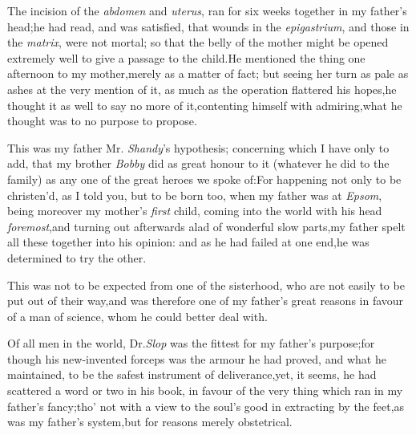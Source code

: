 \documentclass{article}
\begin{document}
The incision of the \textit{abdomen} and \textit{ute\-rus},
ran for six weeks together in my father’s
head;\tsk he had read, and was satisfied, that wounds in
the \textit{epigastrium}, and those in the \textit{matrix}, were not
mortal;\tsk\break
so that the belly of the mother might be\pb
opened extremely well to give a passage to the child.\tsk He mentioned the thing one
afternoon to my mother,\tsk merely as a matter of fact; but seeing her turn as pale
as ashes at the very mention of it, as much as the operation flattered his
hopes,\tsk he thought it as well to say no more of it,\tsk contenting himself with
admiring,\tsk what he thought was to no purpose to propose.

This was my father Mr. \textit{Shandy}’s hypothesis; concerning
which I have only to add, that my brother \textit{Bobby} did as
great honour to it (whatever he did to the family) as any one of
the great heroes we spoke of:\tsk For happening not only to be
christen’d, as I told you, but to be born too, when my father
was at \textit{Epsom},\tsk\break
being moreover my mother’s \textit{first} child,\break
\tsk coming into the world with his head
\textit{foremost},\tsk and turning out afterwards a\pb lad of
wonderful slow parts,\tsh my father spelt all these together
into his opinion: and as he had failed at one end,\tsk he was
determined to try the other.

This was not to be expected from one of the sisterhood, who are
not easily to be put out of their way,\tsh and was
therefore one of my father’s great reasons in favour of a man
of science, whom he could better deal with.

Of all men in the world, Dr.\@ \textit{Slop} was the fittest for my
father’s purpose;\tsh for though his new-invented
forceps was the armour he had proved, and what he maintained, to be
the safest instrument of deliverance,\tsk yet, it seems, he had
scattered a word or two in his book, in favour of the very thing
which ran in my father’s fancy;\tsh tho’ not
with a view to the soul’s good in extracting by the feet,\pb as
was my father’s system,\tsk but for reasons merely
obstetrical.
\end{document}
